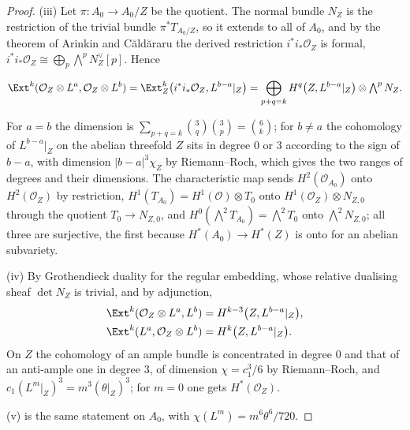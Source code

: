 \begin{proof}
(iii) Let $\pi\colon A_{0}\to A_{0}/Z$ be the quotient. The normal bundle $N_{Z}$ is the restriction of the trivial bundle $\pi^{*}T_{A_{0}/Z}$, so it extends to all of $A_{0}$, and by the theorem of Arinkin and C\u{a}ld\u{a}raru \cite{AC12} the derived restriction $i^{*}i_{*}\mathcal{O}_{Z}$ is formal, $i^{*}i_{*}\mathcal{O}_{Z}\cong\bigoplus_{p}\bigwedge^{p}N_{Z}^{\vee}[p]$. Hence
\begin{widetext}
\begin{equation}\label{eq:cmextz}
\Ext^{k}(\mathcal{O}_{Z}\otimes L^{a},\mathcal{O}_{Z}\otimes L^{b})=\Ext^{k}_{Z}\bigl(i^{*}i_{*}\mathcal{O}_{Z},L^{b-a}|_{Z}\bigr)=\bigoplus_{p+q=k}H^{q}\bigl(Z,L^{b-a}|_{Z}\bigr)\otimes\textstyle\bigwedge^{p}N_{Z}.
\end{equation}
\end{widetext}
For $a=b$ the dimension is $\sum_{p+q=k}\binom{3}{q}\binom{3}{p}=\binom{6}{k}$; for $b\ne a$ the cohomology of $L^{b-a}|_{Z}$ on the abelian threefold $Z$ sits in degree $0$ or $3$ according to the sign of $b-a$, with dimension $|b-a|^{3}\chi_{Z}$ by Riemann--Roch, which gives the two ranges of degrees and their dimensions. The characteristic map sends $H^{2}(\mathcal{O}_{A_{0}})$ onto $H^{2}(\mathcal{O}_{Z})$ by restriction, $H^{1}(T_{A_{0}})=H^{1}(\mathcal{O})\otimes T_{0}$ onto $H^{1}(\mathcal{O}_{Z})\otimes N_{Z,0}$ through the quotient $T_{0}\to N_{Z,0}$, and $H^{0}(\bigwedge^{2}T_{A_{0}})=\bigwedge^{2}T_{0}$ onto $\bigwedge^{2}N_{Z,0}$; all three are surjective, the first because $H^{*}(A_{0})\to H^{*}(Z)$ is onto for an abelian subvariety.

(iv) By Grothendieck duality for the regular embedding, whose relative dualising sheaf $\det N_{Z}$ is trivial, and by adjunction,
\begin{align*}
\Ext^{k}(\mathcal{O}_{Z}\otimes L^{a},L^{b})&=H^{k-3}\bigl(Z,L^{b-a}|_{Z}\bigr),\\
\Ext^{k}(L^{a},\mathcal{O}_{Z}\otimes L^{b})&=H^{k}\bigl(Z,L^{b-a}|_{Z}\bigr).
\end{align*}
On $Z$ the cohomology of an ample bundle is concentrated in degree $0$ and that of an anti-ample one in degree $3$, of dimension $\chi=c_{1}^{3}/6$ by Riemann--Roch, and $c_{1}(L^{m}|_{Z})^{3}=m^{3}(\theta|_{Z})^{3}$; for $m=0$ one gets $H^{*}(\mathcal{O}_{Z})$.

(v) is the same statement on $A_{0}$, with $\chi(L^{m})=m^{6}\theta^{6}/720$.
\end{proof}

